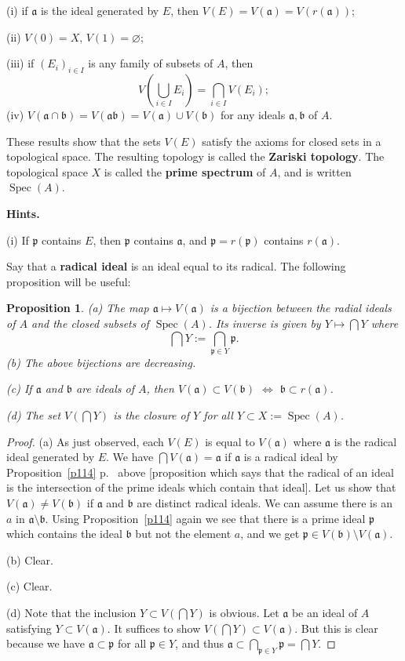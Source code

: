 \documentclass[12pt,letterpaper]{article}%
\newcommand{\mf}{\mathfrak}
\newcommand{\aaa}{\mf a}
\newcommand{\bbb}{\mf b}
\newcommand{\ppp}{\mf p}
\newcommand{\Spec}{\operatorname{Spec}}\newcommand{\Sp}{\operatorname{Spec}}
\newcommand{\nn}{\noindent}
\newtheorem{prop}[thm]{Proposition}
\begin{document}
\nn(i) if $\aaa$ is the ideal generated by $E$, then $V(E)=V(\aaa)=V(r(\aaa))$; 

\nn(ii) $V(0)=X$, $V(1)=\varnothing$;

\nn(iii) if $(E_i)_{i\in I}$ is any family of subsets of $A$, then
$$
V\left(\bigcup_{i\in I}E_i\right)=\bigcap_{i\in I}V(E_i);
$$
(iv) $V(\aaa\cap\bbb)=V(\aaa\bbb)=V(\aaa)\cup V(\bbb)$ for any ideals $\aaa,\bbb$ of $A$.

These results show that the sets $V(E)$ satisfy the axioms for closed sets in a topological space. The resulting topology is called the \textbf{Zariski topology}. The topological space $X$ is called the \textbf{prime spectrum} of $A$, and is written $\Spec(A)$.

\nn\textbf{Hints.} 

\nn(i) If $\ppp$ contains $E$, then $\ppp$ contains $\aaa$, and $\ppp=r(\ppp)$ contains $r(\aaa)$. 

Say that a \textbf{radical ideal} is an ideal equal to its radical. The following proposition will be useful:

\begin{prop}\label{ri}
\emph{(a)} The map $\aaa\mapsto V(\aaa)$ is a bijection between the radial ideals of $A$ and the closed subsets of $\Spec(A)$. Its inverse is given by $Y\mapsto\bigcap Y$ where 
$$
\bigcap Y:=\bigcap_{\ppp\in Y}\ppp.
$$ 
\nn\emph{(b)} The above bijections are decreasing.

\nn\emph{(c)} If $\aaa$ and $\bbb$ are ideals of $A$, then $V(\aaa)\subset V(\bbb)$ $\iff$ $\bbb\subset r(\aaa)$.

\nn\emph{(d)} The set $V(\bigcap Y)$ is the closure of $Y$ for all $Y\subset X:=\Spec(A)$.
\end{prop}

\begin{proof}
(a) As just observed, each $V(E)$ is equal to $V(\aaa)$ where $\aaa$ is the radical ideal generated by $E$. We have $\bigcap V(\aaa)=\aaa$ if $\aaa$ is a radical ideal by Proposition~\ref{p114} p.~\pageref{p114} above [proposition which says that the radical of an ideal is the intersection of the prime ideals which contain that ideal]. Let us show that $V(\aaa)\ne V(\bbb)$ if $\aaa$ and $\bbb$ are distinct radical ideals. We can assume there is an $a$ in $\aaa\setminus\bbb$. Using Proposition~\ref{p114} again we see that there is a prime ideal $\ppp$ which contains the ideal $\bbb$ but not the element $a$, and we get $\ppp\in V(\bbb)\setminus V(\aaa)$.

\nn(b) Clear.

\nn(c) Clear.

\nn(d) Note that the inclusion $Y\subset V(\bigcap Y)$ is obvious. Let $\aaa$ be an ideal of $A$ satisfying $Y\subset V(\aaa)$. It suffices to show $V(\bigcap Y)\subset V(\aaa)$. But this is clear because we have $\aaa\subset\ppp$ for all $\ppp\in Y$, and thus $\aaa\subset\bigcap_{\ppp\in Y}\ppp=\bigcap Y$.
\end{proof}
\end{document}
